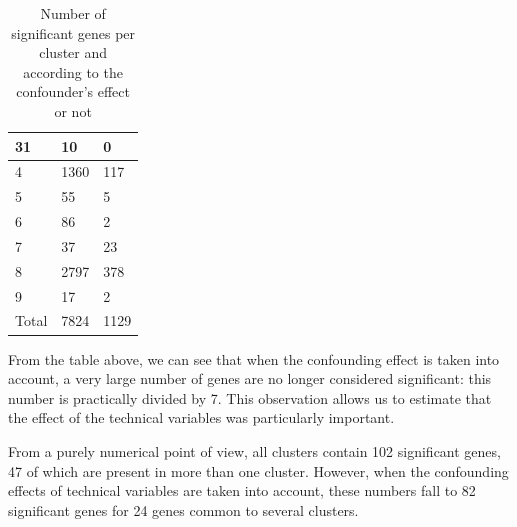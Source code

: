 \documentclass[a4paper, 11pt]{article}
\begin{document}
\begin{multicols}{2}
\begin{table}[H]
\begin{tabularx}{\textwidth}{|X|X|X|}
	31 & 10 & 0 \\ \hline
	4 & 1360 & 117 \\ \hline
	5 & 55 & 5 \\ \hline
	6 & 86 & 2 \\ \hline
	7 & 37 & 23 \\ \hline
	8 & 2797 & 378 \\ \hline
	9 & 17 & 2 \\ \hline
	Total & 7824 & 1129 \\ \hline
	\end{tabularx}
	\caption{Number of significant genes per cluster and according to the confounder's effect or not}
	\label{tab:sigCount}
	\end{table}
From the table above, we can see that when the confounding effect is taken into account, a very large number of genes are no longer considered significant: this number is practically divided by 7. This observation allows us to estimate that the effect of the technical variables was particularly important.

From a purely numerical point of view, all clusters contain 102 significant genes, 47 of which are present in more than one cluster. However, when the confounding effects of technical variables are taken into account, these numbers fall to 82 significant genes for 24 genes common to several clusters. 


\end{multicols}
\end{document}
